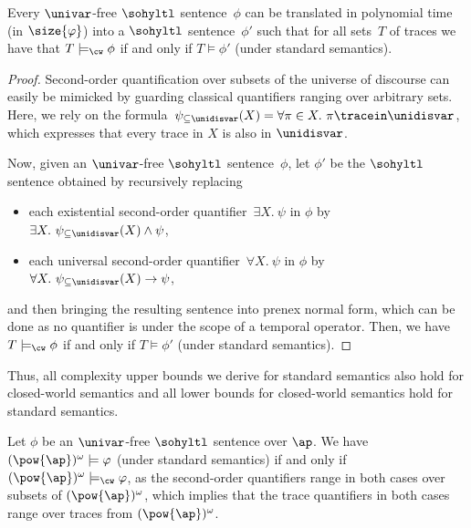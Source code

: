 \begin{lem}
\label{lem_cwtoclassical}
Every $\univar$-free $\sohyltl$ sentence~$\phi$ can be translated in polynomial time (in $\size{\varphi}$) into a $\sohyltl$ sentence~$\phi'$ such that for all sets~$T$ of traces we have that $T \models_\cw \phi$  if and only if  $T \models \phi'$ (under standard semantics).
\end{lem}

\begin{proof}
Second-order quantification over subsets of the universe of discourse can easily be mimicked by guarding classical quantifiers ranging over arbitrary sets.
Here, we rely on the formula~$\psi_{\subseteq \unidisvar}(X) = \forall \pi \in X.\ \pi \tracein \unidisvar$, which expresses that every trace in $X$ is also in $\unidisvar$.

Now, given an $\univar$-free $\sohyltl$ sentence~$\phi$, let $\phi'$ be the $\sohyltl$ sentence obtained by recursively replacing
\begin{itemize}
    \item each existential second-order quantifier~$\exists X.\ \psi$ in $\phi$ by 
    $\exists X.\ \psi_{\subseteq \unidisvar}(X) \wedge \psi $, 
    
    \item each universal second-order quantifier~$\forall X.\ \psi$ in $\phi$ by 
    $\forall X.\ \psi_{\subseteq \unidisvar}(X)\rightarrow \psi$,
\end{itemize}
and then bringing the resulting sentence into prenex normal form, which can be done as no quantifier is under the scope of a temporal operator.
Then, we have $T \models_\cw \phi$  if and only if  $T \models \phi'$ (under standard semantics).
\end{proof}


Thus, all complexity upper bounds we derive for standard semantics also hold for closed-world semantics and all lower bounds for closed-world semantics hold for standard semantics.

\begin{rem}
\label{rem_cwvsclassicalforfullsetoftraces}
Let $\phi$ be an $\univar$-free $\sohyltl$ sentence over $\ap$.
We have $(\pow{\ap})^\omega \models \varphi$ (under standard semantics) if and only if $(\pow{\ap})^\omega \models_\cw \varphi$, as the second-order quantifiers range in both cases over subsets of $(\pow{\ap})^\omega$, which implies that the trace quantifiers in both cases range over traces from $(\pow{\ap})^\omega$.
\end{rem}


